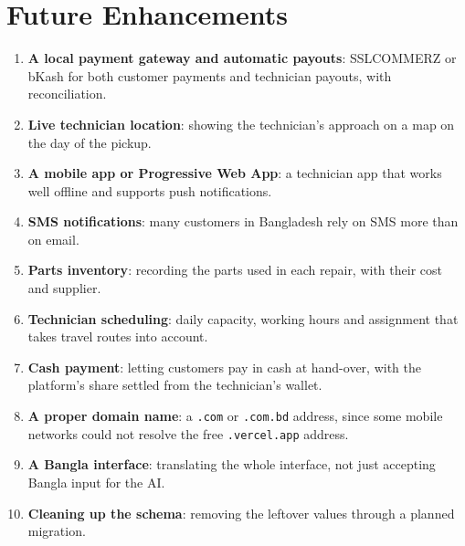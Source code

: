 \documentclass{standalone}
\begin{document}
\section{Future Enhancements}
\begin{enumerate}
  \item \textbf{A local payment gateway and automatic payouts}: SSLCOMMERZ or bKash for both customer payments and technician payouts, with reconciliation.
  \item \textbf{Live technician location}: showing the technician's approach on a map on the day of the pickup.
  \item \textbf{A mobile app or Progressive Web App}: a technician app that works well offline and supports push notifications.
  \item \textbf{SMS notifications}: many customers in Bangladesh rely on SMS more than on email.
  \item \textbf{Parts inventory}: recording the parts used in each repair, with their cost and supplier.
  \item \textbf{Technician scheduling}: daily capacity, working hours and assignment that takes travel routes into account.
  \item \textbf{Cash payment}: letting customers pay in cash at hand-over, with the platform's share settled from the technician's wallet.
  \item \textbf{A proper domain name}: a \texttt{.com} or \texttt{.com.bd} address, since some mobile networks could not resolve the free \texttt{.vercel.app} address.
  \item \textbf{A Bangla interface}: translating the whole interface, not just accepting Bangla input for the AI.
  \item \textbf{Cleaning up the schema}: removing the leftover values through a planned migration.
\end{enumerate}
\end{document}
